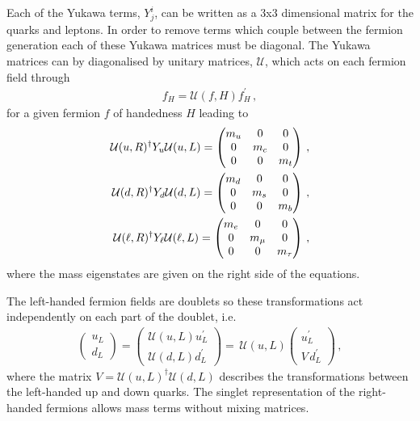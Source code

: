 Each of the Yukawa terms, $Y^i_j$, can be written as a 3x3 dimensional matrix for the quarks and leptons.
In order to remove terms which couple between the fermion generation each of these Yukawa matrices must be diagonal.
The Yukawa matrices can by diagonalised by unitary matrices, $\mathcal{U}$, which acts on each fermion field through
\begin{align}
f_H = \mathcal{U}(f,H) f^{'}_H \, ,
\end{align}
for a given fermion $f$ of handedness $H$ leading to
\begin{subequations}\begin{align}
\mathcal{U}(u,R)^\dagger Y_u \mathcal{U}(u,L) = \begin{pmatrix}m_u&0&0\\0&m_c&0\\0&0&m_t\end{pmatrix} \, , \\
\mathcal{U}(d,R)^\dagger Y_d \mathcal{U}(d,L) = \begin{pmatrix}m_d&0&0\\0&m_s&0\\0&0&m_b\end{pmatrix} \, ,\\
\mathcal{U}(\ell,R)^\dagger Y_\ell \mathcal{U}(\ell,L) = \begin{pmatrix}m_e&0&0\\0&m_\mu&0\\0&0&m_\tau\end{pmatrix} \, , 
\end{align}\end{subequations}
where the mass eigenstates are given on the right side of the equations.

The left-handed fermion fields are \grpsutw doublets so these transformations act independently on
 each part of the doublet, i.e.
\begin{align}
\begin{pmatrix}u_L\\d_L\end{pmatrix} = 
\begin{pmatrix}\mathcal{U}(u,L) u_L^{'}\\ \mathcal{U}(d,L) d_L^{'}\end{pmatrix} = \,
\mathcal{U}(u,L) \begin{pmatrix}u_L^{'}\\V \, d_L^{'}\end{pmatrix}  \, ,
\end{align}
where the matrix $V = \mathcal{U}(u,L)^\dagger\mathcal{U}(d,L)$ describes the transformations between the left-handed up and down quarks.
The \grpsutw singlet representation of the right-handed fermions allows mass terms without mixing matrices.


